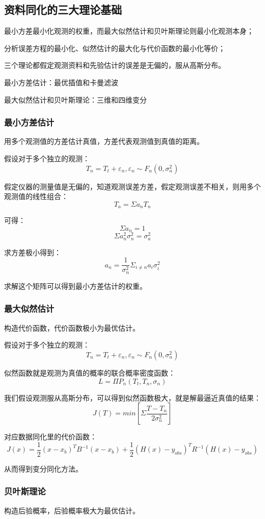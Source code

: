 \documentclass{article}
\begin{document}
\subsection{资料同化的三大理论基础}
最小方差最小化观测的权重，而最大似然估计和贝叶斯理论则最小化观测本身；

分析误差方程的最小化、似然估计的最大化与代价函数的最小化等价；

三个理论都假定观测资料和先验估计的误差是无偏的，服从高斯分布。

最小方差估计：最优插值和卡曼滤波

最大似然估计和贝叶斯理论：三维和四维变分

\subsubsection{最小方差估计}
用多个观测值的方差估计真值，方差代表观测值到真值的距离。

假设对于多个独立的观测：
$$T_n = T_t + \varepsilon_n, \varepsilon_n\sim F_n(0, \sigma^2_n)$$

假定仪器的测量值是无偏的，知道观测误差方差，假定观测误差不相关，则用多个观测值的线性组合：
$$T_a = \Sigma a_n T_n$$

可得：
$$\Sigma a_n = 1$$
$$\Sigma a_n^2 \sigma_n^2 = \sigma_a^2$$

求方差极小得到：
$$a_n = \frac{1}{\sigma_n^2}\Sigma_{i\ne n} a_i\sigma_i^2$$

求解这个矩阵可以得到最小方差估计的权重。

\subsubsection{最大似然估计}
构造代价函数，代价函数极小为最优估计。

假设对于多个独立的观测：
$$T_n = T_t + \varepsilon_n, \varepsilon_n\sim F_n(0, \sigma^2_n)$$

似然函数就是观测为真值的概率的联合概率密度函数：
$$L = \Pi P_n(T_t, T_n, \sigma_n)$$

我们假设观测服从高斯分布，可以得到似然函数极大，就是解最逼近真值的结果：
$$J(T) = min[\Sigma \frac{T-T_n}{2\sigma_n^2}]$$

对应数据同化里的代价函数：
$$J(x) = \frac{1}{2}(x-x_b)^{T}B^{-1}(x-x_b) + \frac{1}{2}(H(x)-y_{obs})^{T}R^{-1}(H(x)-y_{obs})$$

从而得到变分同化方法。

\subsubsection{贝叶斯理论}
构造后验概率，后验概率极大为最优估计。
\end{document}
